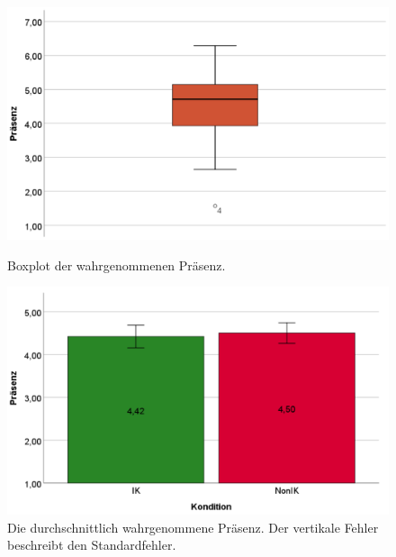 \documentclass[a4paper,11pt]{article}%
\renewcommand{\\}{\vspace*{0.5\baselineskip} \newline}
\begin{document}
{{{{{{{{{{{{{{\begin{figure}[H]
   \begin{minipage}[t]{.5\linewidth} %
      \includegraphics[width=\linewidth]{Abbildungen/AuswertungDiagramme/Final/BP_Presence.png}
      \caption[Boxplot der wahrgenommenen Präsenz]{Boxplot der wahrgenommenen Präsenz.}
      \label{SD_PresenceBP}
   \end{minipage}
   \hspace{.02\linewidth}%
   \begin{minipage}[t]{.5\linewidth} %
     \includegraphics[width=\linewidth]{Abbildungen/AuswertungDiagramme/Final/SD_Presence_Mittelwerte.png}
      \caption[Durchschnittlich wahrgenommene Präsenz der Konditionen]{Die durchschnittlich wahrgenommene Präsenz. Der vertikale Fehler beschreibt den Standardfehler.}
       \label{SD_Presence_Mittel}
   \end{minipage}
\end{figure}

}}}}}}}}}}}}}}
\end{document}
